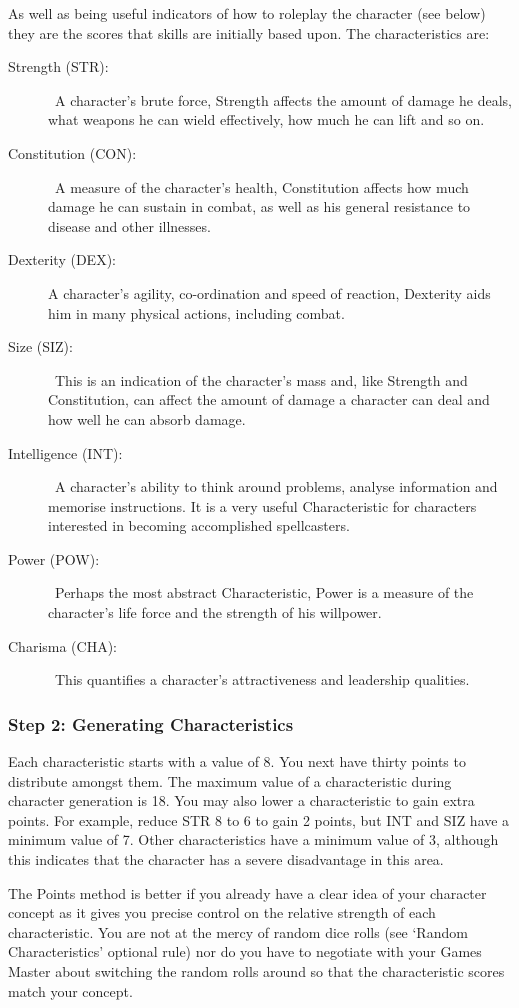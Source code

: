 As well as being useful indicators of how to roleplay the character (see below) they are the scores that skills are initially based upon. The characteristics are:

\begin{description}
	\item[Strength (STR):] A character’s brute force, Strength affects the amount of damage he deals, what weapons he can wield effectively, how much he can lift and so on. 
	\item[Constitution (CON):] A measure of the character’s health, Constitution affects how much damage he can sustain in combat, as well as his general resistance to disease and other illnesses.
	\item[Dexterity (DEX):] A character’s agility, co-ordination and speed of reaction, Dexterity aids him in many physical actions, including combat. 
	\item[Size (SIZ):] This is an indication of the character’s mass and, like Strength and Constitution, can affect the amount of damage a character can deal and how well he can absorb damage.
	\item[Intelligence (INT):] A character’s ability to think around problems, analyse information and memorise instructions. It is a very useful Characteristic for characters interested in becoming accomplished spellcasters. 
	\item[Power (POW):] Perhaps the most abstract Characteristic, Power is a measure of the character’s life force and the strength of his willpower.
	\item[Charisma (CHA):] This quantifies a character’s attractiveness and leadership qualities. 
\end{description}


\subsubsection{Step 2: Generating Characteristics}
Each characteristic starts with a value of 8.  You next have thirty points to distribute amongst them. The maximum value of a characteristic during character generation is 18. You may also lower a characteristic to gain extra points. For example, reduce STR 8 to 6 to gain 2 points, but INT and SIZ have a minimum value of 7.  Other characteristics have a minimum value of 3, although this indicates that the character has a severe disadvantage in this area. 

The Points method is better if you already have a clear idea of your character concept as it gives you precise control on the relative strength of each characteristic. You are not at the mercy of random dice rolls (see `Random Characteristics' optional rule) nor do you have to negotiate with your Games Master about switching the random rolls around so that the characteristic scores match your concept.

